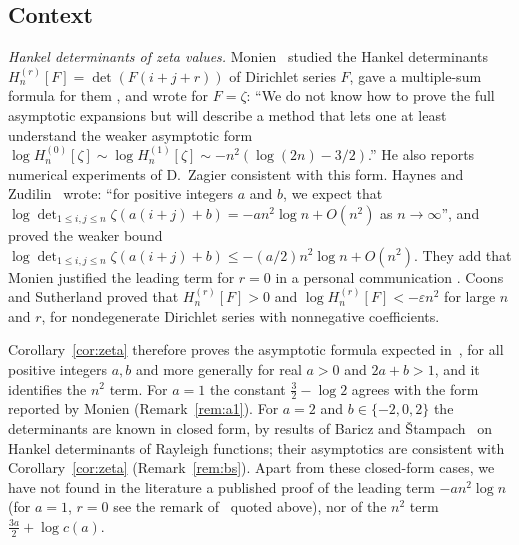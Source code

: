 \documentclass{amsart}
\theoremstyle{definition}
\theoremstyle{remark}
\numberwithin{equation}{section}
\begin{document}
\subsection{Context}\label{sec:context}
\emph{Hankel determinants of zeta values.} Monien~\cite{Monien} studied the Hankel determinants
$H_n^{(r)}[F]=\det(F(i+j+r))$ of Dirichlet series $F$, gave a multiple-sum formula for them \cite[Thm.~2.1]{Monien},
and wrote for $F=\zeta$: ``We do not know how to prove the full asymptotic expansions but will describe a method
that lets one at least understand the weaker asymptotic form $\log H_n^{(0)}[\zeta]\sim\log H_n^{(1)}[\zeta]\sim
-n^2(\log(2n)-3/2)$.'' He also reports numerical experiments of D.~Zagier consistent with this form. Haynes and
Zudilin~\cite{HaynesZudilin} wrote: ``for positive integers $a$ and $b$, we expect that $\log\det_{1\le i,j\le n}
\zeta(a(i+j)+b)=-an^2\log n+O(n^2)$ as $n\to\infty$'', and proved the weaker bound
$\log\det_{1\le i,j\le n}\zeta(a(i+j)+b)\le-(a/2)n^2\log n+O(n^2)$. They add that Monien justified the leading term
for $r=0$ in a personal communication \cite[\S1]{HaynesZudilin}. Coons and Sutherland \cite[Thm.~1.3]{CoonsSutherland}
proved that $H_n^{(r)}[F]>0$ and $\log H_n^{(r)}[F]<-\varepsilon n^2$ for large $n$ and $r$, for nondegenerate Dirichlet series
with nonnegative coefficients.

Corollary~\ref{cor:zeta} therefore proves the asymptotic formula expected in~\cite{HaynesZudilin}, for all positive
integers $a,b$ and more generally for real $a>0$ and $2a+b>1$, and it identifies the $n^2$ term. For $a=1$ the
constant $\frac32-\log2$ agrees with the form reported by Monien (Remark~\ref{rem:a1}). For $a=2$ and
$b\in\{-2,0,2\}$ the determinants are known in closed form, by results of Baricz and
\v{S}tampach~\cite{BariczStampach} on Hankel determinants of Rayleigh functions; their asymptotics are consistent
with Corollary~\ref{cor:zeta} (Remark~\ref{rem:bs}). Apart from these closed-form cases, we have not found in the
literature a published proof of the leading term $-an^2\log n$ (for $a=1$, $r=0$ see the remark
of~\cite{HaynesZudilin} quoted above), nor of the $n^2$ term $\frac{3a}{2}+\log c(a)$.
\end{document}
